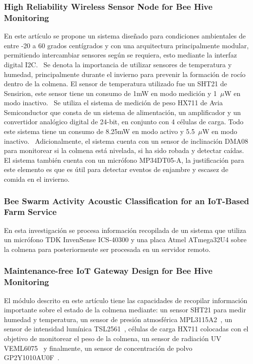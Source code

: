 \subsubsection{High Reliability Wireless Sensor Node for Bee Hive Monitoring}
En este artículo se propone un sistema diseñado para condiciones ambientales de entre -20 a 60 grados centígrados y con una arquitectura principalmente modular, permitiendo intercambiar sensores según se requiera, esto mediante la interfaz digital I2C.~\cite{vidrascu_svasta_vladescu_2016}
Se denota la importancia de utilizar sensores de temperatura y humedad, principalmente durante el invierno para prevenir la formación de rocío dentro de la colmena. El sensor de temperatura utilizado fue un SHT21 de Sensirion, este sensor tiene un consumo de 1mW en modo medición y 1~$\mu$W en modo inactivo.~\cite{vidrascu_svasta_vladescu_2016}
Se utiliza el sistema de medición de peso HX711 de Avia Semiconductor que consta de un sistema de alimentación, un amplificador y un convertidor analógico digital de 24-bit, en conjunto con 4 células de carga. Todo este sistema tiene un consumo de 8.25mW en modo activo y 5.5~$\mu$W en modo inactivo.~\cite{vidrascu_svasta_vladescu_2016}
Adicionalmente, el sistema cuenta con un sensor de inclinación DMA08 para monitorear si la colmena está nivelada, si ha sido robada y detectar caídas.~\cite{vidrascu_svasta_vladescu_2016}
El sistema también cuenta con un micrófono MP34DT05-A, la justificación para este elemento es que es útil para detectar eventos de enjambre y escasez de comida en el invierno.~\cite{vidrascu_svasta_vladescu_2016}

\subsubsection{Bee Swarm Activity Acoustic Classification for an IoT-Based Farm Service}
En esta investigación se procesa información recopilada de un sistema que utiliza un micrófono TDK InvenSense ICS-40300 y una placa Atmel ATmega32U4 sobre la colmena para posteriormente ser procesada en un servidor remoto.~\cite{zgank_2019}

\subsubsection{Maintenance-free IoT Gateway Design for Bee Hive Monitoring}
El módulo descrito en este artículo tiene las capacidades de recopilar información importante sobre el estado de la colmena mediante: un sensor SHT21 para medir humedad y temperatura, un sensor de presión atmosférica MPL3115A2~\cite{nxp_mpl3115a2}, un sensor de intensidad lumínica TSL2561~\cite{tsl2561_adafruit}, células de carga HX711 colocadas con el objetivo de monitorear el peso de la colmena, un sensor de radiación UV VEML6075~\cite{adafruit_veml6075} y finalmente, un sensor de concentración de polvo GP2Y1010AU0F~\cite{vidrascu_svasta_2017b}.~\cite{vidrascu_svasta_2017b}

